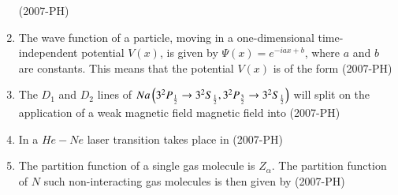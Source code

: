\documentclass[journal]{IEEEtran}
\begin{document}
\begin{enumerate}
    \hfill (2007-PH)
    \item The wave function of a particle, moving in a one-dimensional time-independent potential  $V(x)$, is given by $\Psi(x) = e^{-iax + b}$, where $a$ and $b$ are constants. This means that the potential $V(x)$ is of the form \hfill (2007-PH)
    \begin{enumerate}
    \end{enumerate}
    \item The $D_1$ and $D_2$ lines of $Na\left(3^2P_{\frac{1}{2}} \to 3^2S_{\frac{1}{2}}, 3^2P_{\frac{3}{2}} \to 3^2S_{\frac{1}{2}}\right)$ will split on the application of a weak magnetic field magnetic field into \hfill (2007-PH)
    \begin{enumerate}
    \end{enumerate}
    \item In a $He-Ne$ laser transition takes place in \hfill (2007-PH)
    \begin{enumerate}
    \end{enumerate}
    \item The partition function of a single gas molecule is $Z_{\alpha}$. The partition function of $N$ such non-interacting gas molecules is then given by \hfill (2007-PH)
    \begin{enumerate}

\end{enumerate}
\end{enumerate}
\end{document}
